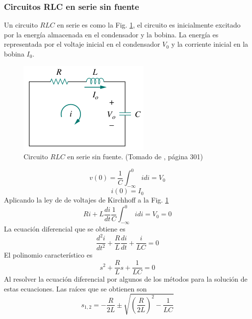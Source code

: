 \documentclass[twocolumn]{IEEEtran}
\begin{document}
\subsubsection{Circuitos RLC en serie sin fuente}
\noindent
Un circuito $RLC$ en serie es como la Fig. \ref{rlcserie}, el circuito es inicialmente excitado por la energía almacenada en el condensador y la bobina. La energía es representada por el voltaje inicial en el condensador $V_0$ y la corriente inicial en la bobina $I_0$.
\begin{figure}[H]
	\centering
		\includegraphics[scale=0.6]{rlcserie.png}
	\caption{Circuito $RLC$ en serie sin fuente. (Tomado de \cite{sadiku}, página 301)}
	\label{rlcserie}
\end{figure}
\begin{equation}
 v\left( 0 \right) = \frac{1}{C}\int_{ - \infty }^0 {idi = {V_0}} 
\end{equation}
\begin{equation}
 i\left( 0 \right) = I_0
\end{equation}
\noindent
Aplicando la ley de de voltajes de Kirchhoff a la Fig. \ref{rlcserie}
\begin{equation}
 R i + L \frac{di}{dt} \frac{1}{C} \int_{ - \infty }^0 {idi = {V_0}} = 0
\end{equation}
\noindent
La ecuación diferencial que se obtiene es
\begin{equation}
 \frac{{{d^2}i}}{{d{t^2}}} + \frac{R}{L}\frac{{di}}{{dt}} + \frac{i}{{LC}} = 0
\label{ecudif2}
\end{equation}
\noindent
El polinomio característico es
\begin{equation}
 s^2 + \frac{R}{L} s + \frac{1}{LC} = 0
\label{polinomio}
\end{equation}
\noindent
Al resolver la ecuación diferencial por algunos de los métodos para la solución de estas ecuaciones. Las raíces que se obtienen son
\begin{equation}
 {s_{1,2}} =  - \frac{R}{{2L}} \pm \sqrt {{{\left( {\frac{R}{{2L}}} \right)}^2} - \frac{1}{{LC}}}
\label{root}
\end{equation}
\end{document}
